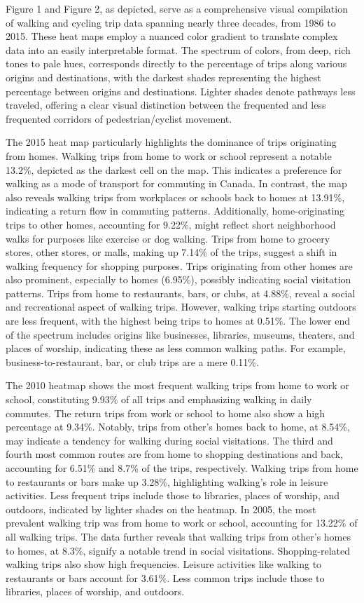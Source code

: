 \documentclass[
11pt, %
oneside, %
english, %
singlespacing, %
]{macthesis} %
\begin{document}
Figure 1 and Figure 2, as depicted, serve as a comprehensive visual compilation of walking and cycling trip data spanning nearly three decades, from 1986 to 2015. These heat maps employ a nuanced color gradient to translate complex data into an easily interpretable format. The spectrum of colors, from deep, rich tones to pale hues, corresponds directly to the percentage of trips along various origins and destinations, with the darkest shades representing the highest percentage between origins and destinations. Lighter shades denote pathways less traveled, offering a clear visual distinction between the frequented and less frequented corridors of pedestrian/cyclist movement.

The 2015 heat map particularly highlights the dominance of trips originating from homes. Walking trips from home to work or school represent a notable 13.2\%, depicted as the darkest cell on the map. This indicates a preference for walking as a mode of transport for commuting in Canada. In contrast, the map also reveals walking trips from workplaces or schools back to homes at 13.91\%, indicating a return flow in commuting patterns. Additionally, home-originating trips to other homes, accounting for 9.22\%, might reflect short neighborhood walks for purposes like exercise or dog walking. Trips from home to grocery stores, other stores, or malls, making up 7.14\% of the trips, suggest a shift in walking frequency for shopping purposes. Trips originating from other homes are also prominent, especially to homes (6.95\%), possibly indicating social visitation patterns. Trips from home to restaurants, bars, or clubs, at 4.88\%, reveal a social and recreational aspect of walking trips. However, walking trips starting outdoors are less frequent, with the highest being trips to homes at 0.51\%. The lower end of the spectrum includes origins like businesses, libraries, museums, theaters, and places of worship, indicating these as less common walking paths. For example, business-to-restaurant, bar, or club trips are a mere 0.11\%.

The 2010 heatmap shows the most frequent walking trips from home to work or school, constituting 9.93\% of all trips and emphasizing walking in daily commutes. The return trips from work or school to home also show a high percentage at 9.34\%. Notably, trips from other's homes back to home, at 8.54\%, may indicate a tendency for walking during social visitations. The third and fourth most common routes are from home to shopping destinations and back, accounting for 6.51\% and 8.7\% of the trips, respectively. Walking trips from home to restaurants or bars make up 3.28\%, highlighting walking's role in leisure activities. Less frequent trips include those to libraries, places of worship, and outdoors, indicated by lighter shades on the heatmap. In 2005, the most prevalent walking trip was from home to work or school, accounting for 13.22\% of all walking trips. The data further reveals that walking trips from other's homes to homes, at 8.3\%, signify a notable trend in social visitations. Shopping-related walking trips also show high frequencies. Leisure activities like walking to restaurants or bars account for 3.61\%. Less common trips include those to libraries, places of worship, and outdoors.
\end{document}
